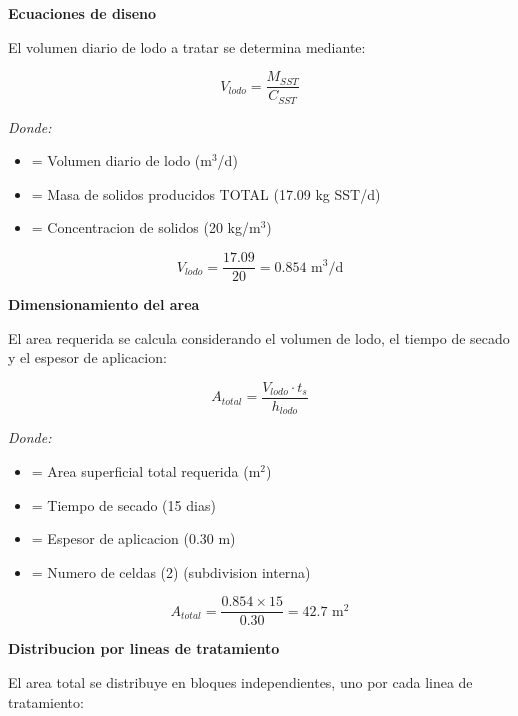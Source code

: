 \textbf{Ecuaciones de diseno}

El volumen diario de lodo a tratar se determina mediante:

\begin{equation}
V_{lodo} = \frac{M_{SST}}{C_{SST}}
\end{equation}

\textit{Donde:}
\begin{itemize}[noitemsep,leftmargin=2em]
    \item[$V_{lodo}$] = Volumen diario de lodo (m$^3$/d)
    \item[$M_{SST}$] = Masa de solidos producidos TOTAL (17.09 kg SST/d)
    \item[$C_{SST}$] = Concentracion de solidos (20 kg/m$^3$)
\end{itemize}

\begin{equation}
V_{lodo} = \frac{17.09}{20} = 0.854 \text{ m}^3\text{/d}
\end{equation}

\textbf{Dimensionamiento del area}

El area requerida se calcula considerando el volumen de lodo, el tiempo de secado y el espesor de aplicacion:

\begin{equation}
A_{total} = \frac{V_{lodo} \cdot t_s}{h_{lodo}}
\end{equation}

\textit{Donde:}
\begin{itemize}[noitemsep,leftmargin=2em]
    \item[$A_{total}$] = Area superficial total requerida (m$^2$)
    \item[$t_s$] = Tiempo de secado (15 dias)
    \item[$h_{lodo}$] = Espesor de aplicacion (0.30 m)
    \item[$n_{celdas}$] = Numero de celdas (2) (subdivision interna)
\end{itemize}

\begin{equation}
A_{total} = \frac{0.854 \times 15}{0.30} = 42.7 \text{ m}^2
\end{equation}

\textbf{Distribucion por lineas de tratamiento}

El area total se distribuye en bloques independientes, uno por cada linea de tratamiento:


